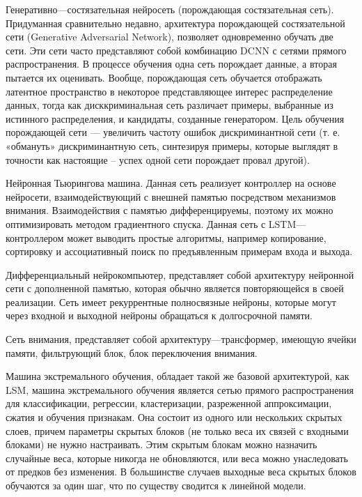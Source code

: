     Генеративно—состязательная нейросеть (порождающая состязательная сеть). Придуманная сравнительно недавно, архитектура порождающей состязательной сети (Generative Adversarial Network), позволяет одновременно обучать две сети. Эти сети часто представляют собой комбинацию DCNN с сетями прямого распространения. В процессе обучения одна сеть порождает данные, а вторая пытается их оценивать. Вообще, порождающая сеть обучается отображать латентное пространство в некоторое представляющее интерес распределение данных, тогда как дисккриминальная сеть различает примеры, выбранные из истинного распределения, и кандидаты, созданные генератором. Цель обучения порождающей сети — увеличить частоту ошибок дискриминантной сети (т. е. «обмануть» дискриминантную сеть, синтезируя примеры, которые выглядят в точности как настоящие – успех одной сети порождает провал другой).
    
    Нейронная Тьюрингова машина. Данная сеть реализует контроллер на основе нейросети, взаимодействующий с внешней памятью посредством механизмов внимания. Взаимодействия с памятью дифференцируемы, поэтому их можно оптимизировать методом градиентного спуска. Данная сеть с LSTM—контроллером может выводить простые алгоритмы, например копирование, сортировку и ассоциативный поиск по предъявленным примерам входа и выхода. 
    
    Дифференциальный нейрокомпьютер, представляет собой архитектуру нейронной сети с дополненной памятью, которая обычно является повторяющейся в своей реализации. Сеть имеет рекуррентные полносвязные нейроны, которые могут через входной и выходной нейроны обращаться к долгосрочной памяти.
    
    Сеть внимания, представляет собой архитектуру—трансформер, имеющую ячейки памяти, фильтрующий блок, блок переключения внимания.
    
    Машина экстремального обучения, обладает такой же базовой архитектурой, как LSM, машина экстремального обучения является сетью прямого распространения для классификации, регрессии, кластеризации, разреженной аппроксимации, сжатия и обучения признакам. Она состоит из одного или нескольких скрытых слоев, причем параметры скрытых блоков (не только веса их связей с входными блоками) не нужно настраивать. Этим скрытым блокам можно назначить случайные веса, которые никогда не обновляются, или веса можно унаследовать от предков без изменения. В большинстве случаев выходные веса скрытых блоков обучаются за один шаг, что по существу сводится к линейной модели.
    
